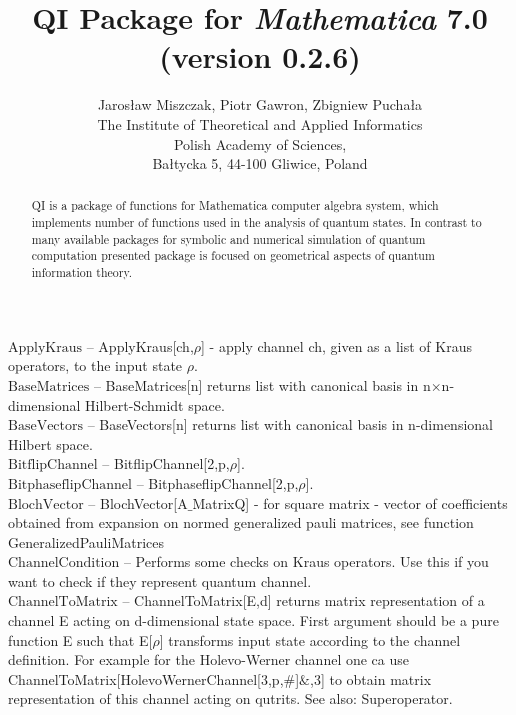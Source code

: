 \documentclass[a4paper,10pt]{scrartcl}
\begin{document}
\title{QI Package for \emph{Mathematica} 7.0 (version 0.2.6)}\author{Jaros{\l}aw Miszczak, Piotr Gawron, Zbigniew Pucha{\l}a\\ \small{The Institute of Theoretical and Applied Informatics}\\
\small{Polish Academy of Sciences},\\ \small{Ba{\l}tycka 5, 44-100 Gliwice, Poland}}
\maketitle
\begin{abstract}QI is a package of functions for Mathematica computer algebra system, which implements 
number of functions used in the analysis of quantum states. In contrast to many available 
packages for symbolic and numerical simulation of quantum computation presented package is focused 
on geometrical aspects of quantum information theory.\end{abstract}
\textbf{$ \text{ApplyKraus} $ }-- ApplyKraus[ch,$\rho $] - apply channel ch, given as a list of Kraus operators, to the input state $\rho $.$  $\\

\textbf{$ \text{BaseMatrices} $ }-- BaseMatrices[n] returns list with canonical basis in n$\times $n-dimensional Hilbert-Schmidt space.$  $\\

\textbf{$ \text{BaseVectors} $ }-- BaseVectors[n] returns list with canonical basis in n-dimensional Hilbert space.$  $\\

\textbf{$ \text{BitflipChannel} $ }-- BitflipChannel[2,p,$\rho $].$  $\\

\textbf{$ \text{BitphaseflipChannel} $ }-- BitphaseflipChannel[2,p,$\rho $].$  $\\

\textbf{$ \text{BlochVector} $ }-- BlochVector[A$\_$MatrixQ] - for square matrix - vector of coefficients obtained from expansion on normed generalized pauli matrices, see function GeneralizedPauliMatrices$  $\\

\textbf{$ \text{ChannelCondition} $ }-- Performs some checks on Kraus operators. Use this if you want to check if they represent quantum channel.$  $\\

\textbf{$ \text{ChannelToMatrix} $ }-- ChannelToMatrix[E,d] returns matrix representation of a channel E acting on d-dimensional state space. First argument should be a pure function E such that E[$\rho $] transforms input state according to the channel definition. For example for the Holevo-Werner channel one ca use ChannelToMatrix[HolevoWernerChannel[3,p,$\#$]$\&$,3] to obtain matrix representation of this channel acting on qutrits. See also: Superoperator.$  $\\
\end{document}
